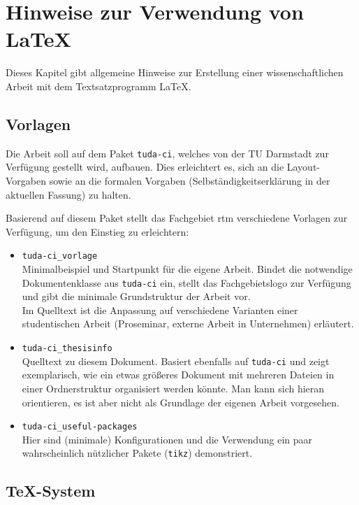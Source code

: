\chapter{Hinweise zur Verwendung von \LaTeX}
\label{cha:Hinweise_Latex}

Dieses Kapitel gibt allgemeine Hinweise zur Erstellung einer wissenschaftlichen Arbeit mit dem Textsatzprogramm \LaTeX.


\section{Vorlagen}

Die Arbeit soll auf dem Paket \verb|tuda-ci|, welches von der TU Darmstadt zur Verfügung gestellt wird, aufbauen.
Dies erleichtert es, sich an die Layout-Vorgaben sowie an die formalen Vorgaben (Selbständigkeitserklärung in der aktuellen Fassung) zu halten.

Basierend auf diesem Paket stellt das Fachgebiet rtm verschiedene Vorlagen zur Verfügung, um den Einstieg zu erleichtern:
\begin{itemize}
  \item \verb|tuda-ci_vorlage|\\
    Minimalbeispiel und Startpunkt für die eigene Arbeit.
    Bindet die notwendige Dokumentenklasse aus \verb|tuda-ci| ein, stellt das Fachgebietslogo zur Verfügung und gibt die minimale Grundstruktur der Arbeit vor.\\
    Im Quelltext ist die Anpassung auf verschiedene Varianten einer studentischen Arbeit (Proseminar, externe Arbeit in Unternehmen) erläutert.
  \item \verb|tuda-ci_thesisinfo|\\
    Quelltext zu diesem Dokument.
    Basiert ebenfalls auf \verb|tuda-ci| und zeigt exemplarisch, wie ein etwas größeres Dokument mit mehreren Dateien in einer Ordnerstruktur organisiert werden könnte.
    Man kann sich hieran orientieren, es ist aber nicht als Grundlage der eigenen Arbeit vorgesehen.
  \item \verb|tuda-ci_useful-packages|\\
    Hier sind (minimale) Konfigurationen und die Verwendung ein paar wahrscheinlich nützlicher Pakete (\zB \verb|tikz|) demonstriert.
\end{itemize}



\section{\TeX-System}

